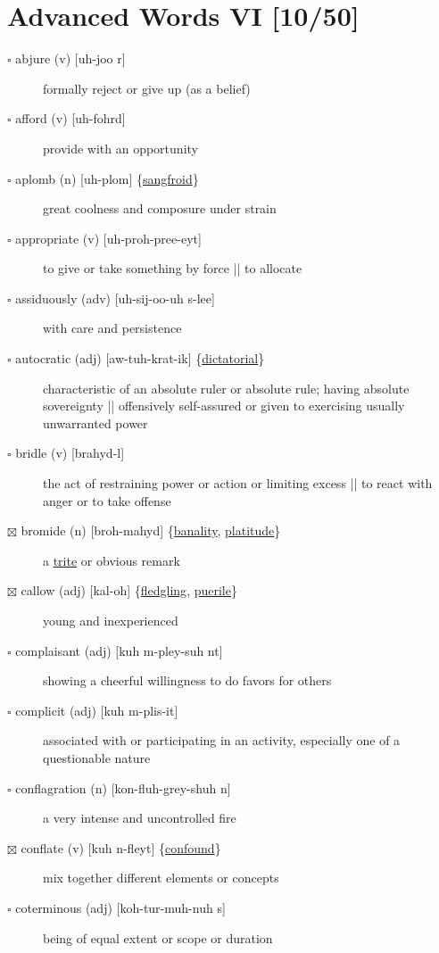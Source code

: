 \documentclass[11pt]{article}
\begin{document}
\section{Advanced Words VI [10/50]}
\label{sec:org2c5c91a}
\begin{description}
\item[{$\square$ abjure (v) [uh-joo r]}] formally reject or give up (as a belief)
\item[{$\square$ afford (v) [uh-fohrd]}] provide with an opportunity
\item[{$\square$ \label{orga1f4044}aplomb (n) [uh-plom] \{\hyperref[org07d57b7]{sangfroid}\}}] great coolness and composure under strain
\item[{$\square$ appropriate (v) [uh-proh-pree-eyt]}] to give or take something by force || to allocate
\item[{$\square$ assiduously (adv) [uh-sij-oo-uh s-lee]}] with care and persistence
\item[{$\square$ \label{orgffb70f5}autocratic (adj) [aw-tuh-krat-ik] \{\hyperref[orgcf82f48]{dictatorial}\}}] characteristic of an absolute ruler or absolute rule; having absolute sovereignty || offensively self-assured or given to exercising usually unwarranted power
\item[{$\square$ bridle (v) [brahyd-l]}] the act of restraining power or action or limiting excess || to react with anger or to take offense
\item[{$\boxtimes$ \label{org73365c5}bromide (n) [broh-mahyd] \{\hyperref[orga4de2d2]{banality}, \hyperref[org953e432]{platitude}\}}] a \hyperref[org91e02d4]{trite} or obvious remark
\item[{$\boxtimes$ \label{org46bdddd}callow (adj) [kal-oh] \{\hyperref[orgecf834e]{fledgling}, \hyperref[org45ddcde]{puerile}\}}] young and inexperienced
\item[{$\square$ complaisant (adj) [kuh m-pley-suh nt]}] showing a cheerful willingness to do favors for others
\item[{$\square$ complicit (adj) [kuh m-plis-it]}] associated with or participating in an activity, especially one of a questionable nature
\item[{$\square$ conflagration (n) [kon-fluh-grey-shuh n]}] a very intense and uncontrolled fire
\item[{$\boxtimes$ \label{org3b11bb2} \label{org10376b8}conflate (v) [kuh n-fleyt] \{\hyperref[org6671323]{confound}\}}] mix together different elements or concepts
\item[{$\square$ coterminous (adj) [koh-tur-muh-nuh s]}] being of equal extent or scope or duration

\end{description}
\end{document}
